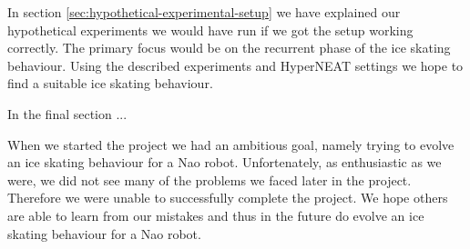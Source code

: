 \documentclass[a4paper,10pt]{article}
\begin{document}
In section \ref{sec:hypothetical-experimental-setup} we have explained our hypothetical experiments we would have run if we got the setup working correctly. The primary focus would be on the recurrent phase of the ice skating behaviour. Using the described experiments and HyperNEAT settings we hope to find a suitable ice skating behaviour.

In the final section ...

When we started the project we had an ambitious goal, namely trying to evolve an ice skating behaviour for a Nao robot. Unfortenately, as enthusiastic as we were, we did not see many of the problems we faced later in the project. Therefore we were unable to successfully complete the project. We hope others are able to learn from our mistakes and thus in the future do evolve an ice skating behaviour for a Nao robot.



\end{document}
